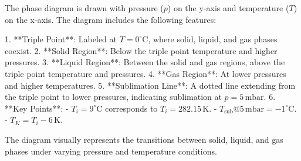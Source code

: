 The phase diagram is drawn with pressure (\( p \)) on the y-axis and temperature (\( T \)) on the x-axis. The diagram includes the following features:  

1. **Triple Point**: Labeled at \( T = 0^\circ\text{C} \), where solid, liquid, and gas phases coexist.  
2. **Solid Region**: Below the triple point temperature and higher pressures.  
3. **Liquid Region**: Between the solid and gas regions, above the triple point temperature and pressures.  
4. **Gas Region**: At lower pressures and higher temperatures.  
5. **Sublimation Line**: A dotted line extending from the triple point to lower pressures, indicating sublimation at \( p = 5 \, \text{mbar} \).  
6. **Key Points**:  
   - \( T_i = 9^\circ\text{C} \) corresponds to \( T_i = 282.15 \, \text{K} \).  
   - \( T_{\text{sub}} @ 5 \, \text{mbar} = -1^\circ\text{C} \).  
   - \( T_K = T_i - 6 \, \text{K} \).  

The diagram visually represents the transitions between solid, liquid, and gas phases under varying pressure and temperature conditions.